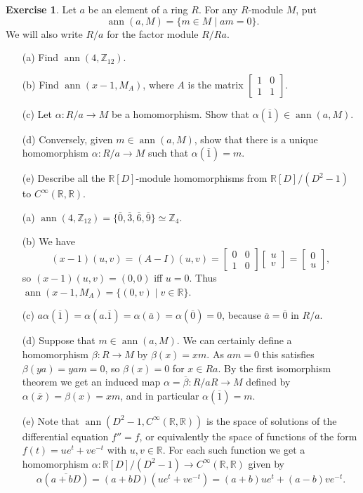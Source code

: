 \documentclass{amsart}
\newcommand{\ann}       {\operatorname{ann}}
\newcommand{\bbm}       {\left[\begin{matrix}}
\newcommand{\bsm}       {\left[\begin{smallmatrix}}
\newcommand{\ebm}       {\end{matrix}\right]}
\newcommand{\esm}       {\end{smallmatrix}\right]}
\newcommand{\R}         {{\mathbb{R}}}
\newcommand{\Z}         {{\mathbb{Z}}}
\newcommand{\al}        {\alpha}
\newcommand{\bt}        {\beta}
\newcommand{\ov}[1]     {\overline{#1}}
\newcommand{\CRR}       {C^\infty(\R,\R)}
\newcommand{\xra}       {\xrightarrow}
\newcommand{\st}        {\;|\;}
\newcommand{\ip}[1]     {\langle #1\rangle}
\renewcommand{\:}{\colon}
\theoremstyle{definition}
\newtheorem{exercise}{Exercise}[section]
\renewenvironment{solution}{\SolutionAtEnd}{\endSolutionAtEnd}
\begin{document}
\begin{exercise}
 Let $a$ be an element of a ring $R$.  For any $R$-module $M$, put
 \[ \ann(a,M)=\{m\in M\st am=0\}. \]
 We will also write $R/a$ for the factor module $R/Ra$.

 \begin{itemize}
  \item[(a)] Find $\ann(4,\Z_{12})$.
  \item[(b)] Find $\ann(x-1,M_A)$, where $A$ is the matrix
   $\bsm 1&0\\1&1\esm$.
  \item[(c)] Let $\al\:R/a\xra{}M$ be a homomorphism.  Show that
   $\al(\ov{1})\in\ann(a,M)$.
  \item[(d)] Conversely, given $m\in\ann(a,M)$, show that there is a
   unique homomorphism $\al\:R/a\xra{}M$ such that $\al(\ov{1})=m$.
  \item[(e)] Describe all the $\R[D]$-module homomorphisms from
   $\R[D]/(D^2-1)$ to $\CRR$.
 \end{itemize}
\end{exercise}
\begin{solution}
 \begin{itemize}
  \item[(a)]
   $\ann(4,\Z_{12})=\{\ov{0},\ov{3},\ov{6},\ov{9}\}\simeq\Z_4$.
  \item[(b)]
   We have 
   \[ (x-1)(u,v) = (A-I)(u,v) = \bbm 0&0\\1&0 \ebm\bbm u\\ v\ebm = 
       \bbm 0 \\ u \ebm, 
   \] 
   so $(x-1)(u,v)=(0,0)$ iff $u=0$.  Thus
   $\ann(x-1,M_A)=\{(0,v)\st v\in\R\}$.
  \item[(c)] $a\al(\ov{1})=\al(a.\ov{1})=\al(\ov{a})=\al(\ov{0})=0$,
   because $\ov{a}=\ov{0}$ in $R/a$.
  \item[(d)] Suppose that $m\in\ann(a,M)$.  We can certainly define a
   homomorphism $\bt\:R\xra{}M$ by $\bt(x)=xm$.  As $am=0$ this satisfies
   $\bt(ya)=yam=0$, so $\bt(x)=0$ for $x\in Ra$.  By the first
   isomorphism theorem we get an induced map
   $\al=\ov{\bt}\:R/aR\xra{}M$ defined by $\al(\ov{x})=\bt(x)=xm$, and
   in particular $\al(\ov{1})=m$.
  \item[(e)] Note that $\ann(D^2-1,\CRR)$ is the space of solutions of
   the differential equation $f''=f$, or equivalently the space of
   functions of the form $f(t)=ue^t+ve^{-t}$ with $u,v\in\R$.  For
   each such function we get a homomorphism
   $\al\:\R[D]/(D^2-1)\xra{}\CRR$ given by
   \[ \al(\ov{a+bD}) = (a+bD)(ue^t+ve^{-t}) = 
       (a+b)ue^t + (a-b)ve^{-t}.
   \]
 \end{itemize}
\end{solution}
\end{document}
